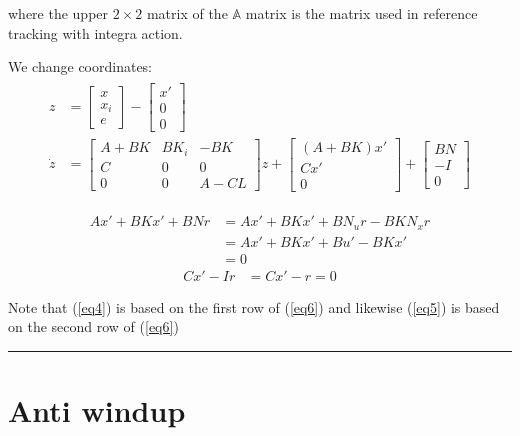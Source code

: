 \documentclass[a4paper]{article}
\begin{document}
where the upper $ 2 \times 2 $ matrix of the $ \mathbb{A} $ matrix is the matrix used in reference tracking with integra action.

We change coordinates:
\begin{align}
	\begin{aligned}
	z &= \begin{bmatrix}
x \\
x_i \\
e
\end{bmatrix} - \begin{bmatrix}
x' \\
0 \\
0
\end{bmatrix} \\ \label{eq6} \dot{z} &= \begin{bmatrix}
A + BK & B K_i & -B K\\
C & 0 & 0\\
0 & 0 & A - C L
\end{bmatrix} z + \begin{bmatrix}
(A+BK) x' \\
C x' \\
0	
\end{bmatrix} + \begin{bmatrix}
B N \\
-I \\
0
\end{bmatrix} 
	\end{aligned}
\end{align}

\begin{align}\label{eq4}
	A x' + B K x' + B N r &= A x' + B K x' + B N_u r - B K N_x r \\
						  &= A x' + B K x' + B u' - B K x'\\
						  &= 0
\end{align}
\begin{align}\label{eq5}
C x' - I r &= C x' - r = 0 
\end{align}

Note that (\ref{eq4}) is based on the first row of (\ref{eq6}) and likewise (\ref{eq5}) is based on the second row of (\ref{eq6})

\vspace{5pt}
\hrule
\vspace{5pt}
\section{Anti windup}
\end{document}
